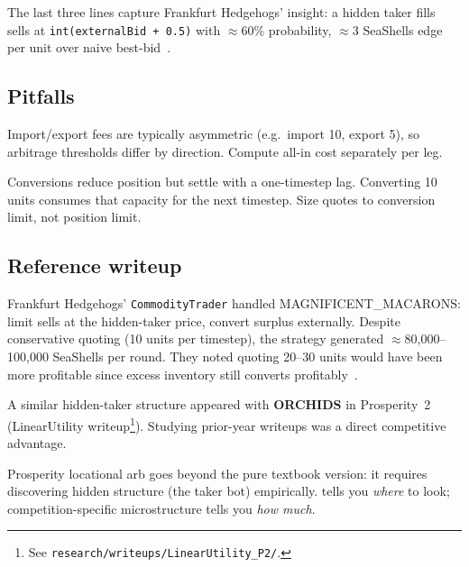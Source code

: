 \noindent
The last three lines capture Frankfurt Hedgehogs' insight: a hidden
taker fills sells at \texttt{int(externalBid + 0.5)} with
$\approx$60\% probability, $\approx$3 SeaShells edge per unit over
naive best-bid~\citep{frankfurthedgehogs2025}.

\subsection{Pitfalls}

\begin{pitfallbox}
Import/export fees are typically asymmetric (e.g.\ import 10, export
5), so arbitrage thresholds differ by direction.  Compute all-in cost
separately per leg.
\end{pitfallbox}

\begin{pitfallbox}
Conversions reduce position but settle with a one-timestep lag.
Converting 10 units consumes that capacity for the next timestep.
Size quotes to conversion limit, not position limit.
\end{pitfallbox}

\subsection{Reference writeup}

Frankfurt Hedgehogs' \texttt{CommodityTrader} handled
MAGNIFICENT\_MACARONS: limit sells at the hidden-taker price,
convert surplus externally.  Despite conservative quoting (10 units
per timestep), the strategy generated $\approx$80{,}000--100{,}000
SeaShells per round.  They noted quoting 20--30 units would have
been more profitable since excess inventory still converts
profitably~\citep{frankfurthedgehogs2025}.

A similar hidden-taker structure appeared with \textbf{ORCHIDS} in
Prosperity~2 (LinearUtility
writeup\footnote{See \texttt{research/writeups/LinearUtility\_P2/}.}).
Studying prior-year writeups was a direct competitive advantage.

\begin{intuitionbox}
Prosperity locational arb goes beyond the pure textbook version: it
requires discovering hidden structure (the taker bot) empirically.
 tells you \emph{where} to look;
competition-specific microstructure tells you \emph{how much}.
\end{intuitionbox}

